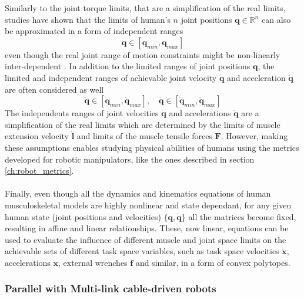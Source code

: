 Similarly to the joint torque limits, that are a simplification of the real limits, studies have shown that the limits of human's $n$ joint positions $\bm{q} \in \mathbb{R}^n$ can also be approximated in a form of independent ranges \cite{SOUCIE2011}
\begin{equation}
    \bm{q} \in  [\bm{q}_{min}, \bm{q}_{max} ]
    \label{eq:human_js_pos_range}
\end{equation}
even though the real joint range of motion constraints might be non-linearly inter-dependent \cite{Kane2014}.
In addition to the limited ranges of joint positions $\bm{q}$, the limited and independent ranges of achievable joint velocity $\dot{\bm{q}}$ and acceleration $\ddot{\bm{q}}$ are often considered as well \cite{Grimmer2020}
\begin{equation}
    \dot{\bm{q}} \in  [\dot{\bm{q}}_{min}, \dot{\bm{q}}_{max} ], \quad \ddot{\bm{q}} \in  [\ddot{\bm{q}}_{min}, \ddot{\bm{q}}_{max} ]
    \label{eq:human_js_vel_lim}
\end{equation}
The independents ranges of joint velocities $\dot{\bm{q}}$ and accelerations $\ddot{\bm{q}}$ are a simplification of the real limits which are determined by the limits of muscle extension velocity $\dot{\bm{l}}$ and limits of the muscle tensile forces $\bm{F}$. However, making these assumptions enables studying physical abilities of humans using the metrics developed for robotic manipulators, like the ones described in section \ref{ch:robot_metrics}. 



\paragraph*{} Finally, even though all the dynamics and kinematics equations of human musculoskeletal models are highly nonlinear and state dependant, for any given human state (joint positions and velocities) $\{\bm{q},\dot{\bm{q}}\}$ all the matrices become fixed, resulting in affine and linear relationships. 
These, now linear, equations can be used to evaluate the influence of different muscle and joint space limits on the achievable sets of different task space variables, such as task space velocities $\dot{\bm{x}}$, accelerations $\ddot{\bm{x}}$,  external wrenches $\bm{f}$ and similar, in a form of convex polytopes. 


\subsubsection{Parallel with Multi-link cable-driven robots}

